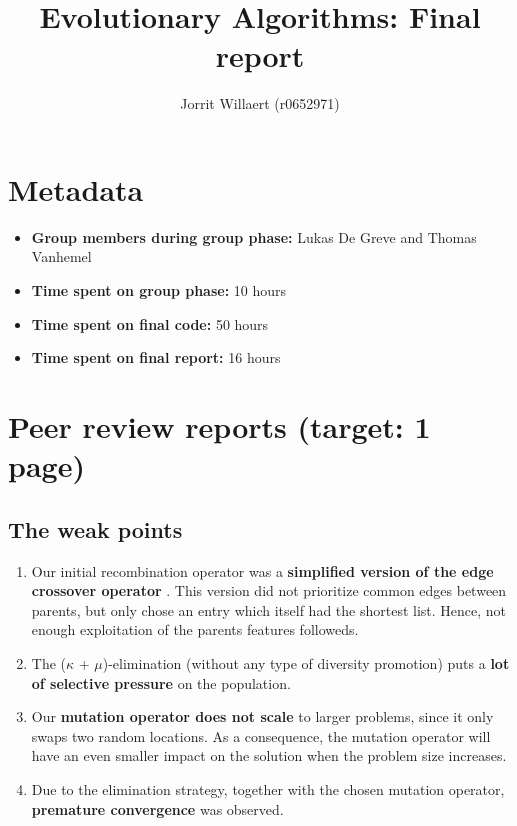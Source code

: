 \documentclass[a4paper,10pt]{article}
\title{Evolutionary Algorithms: Final report}
\author{Jorrit Willaert (r0652971)}
\begin{document}
\selectfont{}


\maketitle

\section{Metadata}

\begin{itemize}
 \item \textbf{Group members during group phase:} Lukas De Greve and Thomas Vanhemel
 \item \textbf{Time spent on group phase:} 10 hours
 \item \textbf{Time spent on final code:} 50 hours
 \item \textbf{Time spent on final report:} 16 hours
\end{itemize}

\section{Peer review reports (target: 1 page)}

\subsection{The weak points}
\begin{enumerate}
 \item Our initial recombination operator was a \textbf{simplified version of the edge crossover operator} \cite{initial_implementation_edge_crossover}. This version did not prioritize common edges between parents, but only chose an entry which itself had the shortest list. Hence, not enough exploitation of the parents features followeds. 
 \item The ($\kappa$ + $\mu$)-elimination (without any type of diversity promotion) puts a \textbf{lot of selective pressure} on the population.
 \item Our \textbf{mutation operator does not scale} to larger problems, since it only swaps two random locations. As a consequence, the mutation operator will have an even smaller impact on the solution when the problem size increases. 
 \item Due to the elimination strategy, together with the chosen mutation operator, \textbf{premature convergence} was observed.
\end{enumerate}
\end{document}
